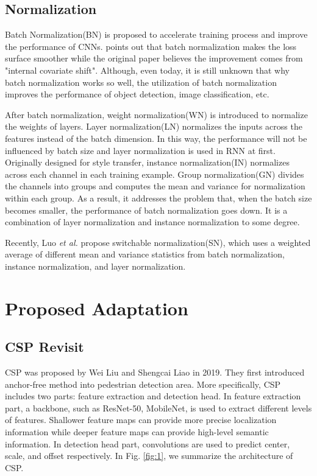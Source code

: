 \documentclass[twocolumn]{article}
\begin{document}
\subsection{Normalization}\label{Norm}
Batch Normalization(BN)\cite{ioffe2015batch} is proposed to accelerate training process and improve the performance of CNNs. \cite{santurkar2018does} points out that batch normalization makes the loss surface smoother while the original paper\cite{ioffe2015batch} believes the improvement comes from "internal covariate shift". Although, even today, it is still unknown that why batch normalization works so well, the utilization of batch normalization improves the performance of object detection, image classification, etc.\par 
After batch normalization, weight normalization(WN)\cite{salimans2016weight} is introduced to normalize the weights of layers. Layer normalization(LN)\cite{ba2016layer} normalizes the inputs across the features instead of the batch dimension. In this way, the performance will not be influenced by batch size and layer normalization is used in RNN at first. Originally designed for style transfer, instance normalization(IN)\cite{ulyanov2016instance} normalizes across each channel in each training example. Group normalization(GN)\cite{wu2018group} divides the channels into groups and computes the mean and variance for normalization within each group. As a result, it addresses the problem that, when the batch size becomes smaller, the performance of batch normalization goes down. It is a combination of layer normalization and instance normalization to some degree. \par 
Recently, Luo \textit{et al.} propose switchable normalization(SN)\cite{luo2018differentiable}, which uses a weighted average of different mean and variance statistics from batch normalization, instance normalization, and layer normalization. 

\section{Proposed Adaptation}
\subsection{CSP Revisit}
CSP\cite{liu2019high} was proposed by Wei Liu and Shengcai Liao in 2019. They first introduced anchor-free method into pedestrian detection area. More specifically, CSP\cite{liu2019high} includes two parts: feature extraction and detection head. In feature extraction part, a backbone, such as ResNet-50\cite{he2016deep}, MobileNet\cite{howard2017mobilenets}, is used to extract different levels of features. Shallower feature maps can provide more precise localization information while deeper feature maps can provide high-level semantic information. In detection head part, convolutions are used to predict center, scale, and offset respectively. In Fig. \ref{fig:1}, we summarize the architecture of CSP\cite{liu2019high}.\par 
\end{document}
